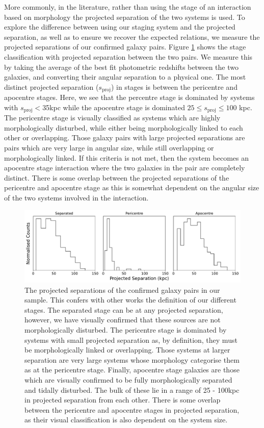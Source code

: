 More commonly, in the literature, rather than using the stage of an interaction based on morphology the projected separation of the two systems is used. To explore the difference between using our staging system and the projected separation, as well as to ensure we recover the expected relations, we measure the projected separations of our confirmed galaxy pairs. Figure \ref{fig:proj-seps} shows the stage classification with projected separation between the two pairs. We measure this by taking the average of the best fit photometric redshifts between the two galaxies, and converting their angular separation to a physical one. The most distinct projected separation ($s_{\mathrm{proj}}$) in stages is between the pericentre and apocentre stages. Here, we see that the percentre stage is dominated by systems with $s_{\mathrm{proj}}<$35kpc while the apocentre stage is dominated $25 \leq s_{\mathrm{proj}} \leq 100$ kpc. The pericentre stage is visually classified as systems which are highly morphologically disturbed, while either being morphologically linked to each other or overlapping. Those galaxy pairs with large projected separations are pairs which are very large in angular size, while still overlapping or morphologically linked. If this criteria is not met, then the system becomes an apocentre stage interaction where the two galaxies in the pair are completely distinct. There is some overlap between the projected separations of the pericentre and apocentre stage as this is somewhat dependent on the angular size of the two systems involved in the interaction.

\begin{figure}
    \centering
    \includegraphics[width=\textwidth]{Chapter3/figures/projected-seps.pdf}
    \caption[The projected separations of the confirmed galaxy pairs in our sample.]{The projected separations of the confirmed galaxy pairs in our sample. This confers with other works the definition of our different stages. The separated stage can be at any projected separation, however, we have visually confirmed that these sources are not morphologically disturbed. The pericentre stage is dominated by systems with small projected separation as, by definition, they must be morphologically linked or overlapping. Those systems at larger separation are very large systems whose morphology categorise them as at the pericentre stage. Finally, apocentre stage galaxies are those which are visually confirmed to be fully morphologically separated and tidally disturbed. The bulk of these lie in a range of 25 - 100kpc in projected separation from each other. There is some overlap between the pericentre and apocentre stages in projected separation, as their visual classification is also dependent on the system size.}
    \label{fig:proj-seps}
\end{figure}

